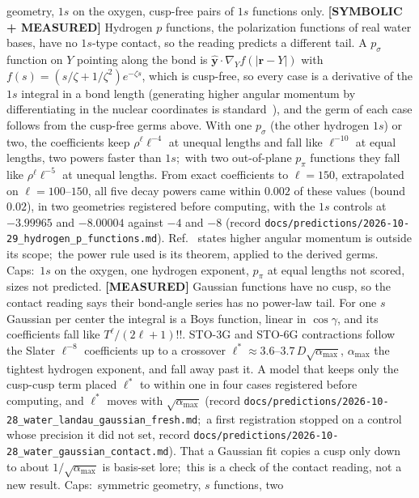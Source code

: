 \documentclass[aps,pra,twocolumn,superscriptaddress,longbibliography]{revtex4-2}
\begin{document}
geometry, $1s$ on the oxygen, cusp-free pairs of $1s$ functions only.
\textbf{[SYMBOLIC + MEASURED]} Hydrogen $p$ functions, the polarization functions of real
water bases, have no $1s$-type contact, so the reading predicts a different tail.  A
$p_\sigma$ function on $Y$ pointing along the bond is $\hat{\mathbf{y}}\cdot\nabla_Y
f(|\mathbf{r}-Y|)$ with $f(s)=(s/\zeta+1/\zeta^{2})e^{-\zeta s}$, which is cusp-free, so every
case is a derivative of the $1s$ integral in a bond length (generating higher angular
momentum by differentiating in the nuclear coordinates is standard~\cite{weniger2005}), and
the germ of each case follows from the cusp-free germs above.  With one $p_\sigma$ (the other hydrogen $1s$) or two, the
coefficients keep $\rho^{\ell}\ell^{-4}$ at unequal lengths and fall like $\ell^{-10}$ at equal
lengths, two powers faster than $1s$;\ with two out-of-plane $p_\pi$ functions they fall like
$\rho^{\ell}\ell^{-5}$ at unequal lengths.  From exact coefficients to $\ell=150$, extrapolated
on $\ell=100$--$150$, all five decay powers came within $0.002$ of these values (bound $0.02$),
in two geometries registered before computing, with the $1s$ controls at $-3.99965$ and
$-8.00004$ against $-4$ and $-8$ (record
\texttt{docs/predictions/2026-10-29\_hydrogen\_p\_functions.md}).  Ref.~\cite{matuzas2026sc}
states higher angular momentum is outside its scope;\ the power rule used is its theorem,
applied to the derived germs.  Caps:\ $1s$ on the oxygen, one hydrogen exponent, $p_\pi$ at
equal lengths not scored, sizes not predicted.
\textbf{[MEASURED]} Gaussian functions have no cusp, so the contact reading says their
bond-angle series has no power-law tail.  For one $s$ Gaussian per center the integral is a
Boys function, linear in $\cos\gamma$, and its coefficients fall like $T^{\ell}/(2\ell+1)!!$.
STO-3G and STO-6G contractions follow the Slater $\ell^{-8}$ coefficients up to a crossover
$\ell^{*}\approx3.6$--$3.7\,D\sqrt{\alpha_{\max}}$, $\alpha_{\max}$ the tightest hydrogen
exponent, and fall away past it.  A model that keeps only the cusp-cusp term placed
$\ell^{*}$ to within one in four cases registered before computing, and $\ell^{*}$ moves with
$\sqrt{\alpha_{\max}}$ (record
\texttt{docs/predictions/2026-10-28\_water\_landau\_gaussian\_fresh.md};\ a first registration
stopped on a control whose precision it did not set, record
\texttt{docs/predictions/2026-10-28\_water\_gaussian\_contact.md}).  That a Gaussian fit
copies a cusp only down to about $1/\sqrt{\alpha_{\max}}$ is basis-set lore;\ this is a check
of the contact reading, not a new result.  Caps:\ symmetric geometry, $s$ functions, two
\end{document}
